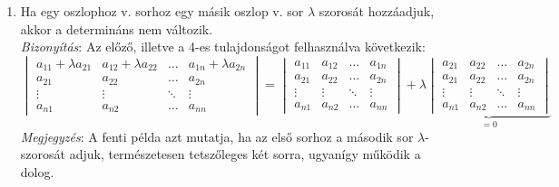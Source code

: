 \documentclass[a4paper,12pt,twoside]{book}
\theoremstyle{break}
\begin{document}
\begin{enumerate}
 \item Ha egy oszlophoz v. sorhoz egy másik oszlop v. sor $\lambda$ szorosát hozzáadjuk, akkor a determináns nem változik.\vspace*{5pt}\\
 \textit{Bizonyítás}: Az előző, illetve a 4-es tulajdonságot felhasználva következik:
\[\begin{vmatrix}
a_{11}+\lambda a_{21} & a_{12}+\lambda a_{22} & \ldots & a_{1n}+\lambda a_{2n}\\
a_{21} & a_{22} & \ldots & a_{2n}\\
\vdots & \vdots & \ddots & \vdots\\
a_{n1} & a_{n2} & \ldots & a_{nn}          
\end{vmatrix} = \begin{vmatrix}
a_{11} & a_{12} & \ldots & a_{1n}\\
a_{21} & a_{22} & \ldots & a_{2n}\\
\vdots & \vdots & \ddots & \vdots\\
a_{n1} & a_{n2} & \ldots & a_{nn}          
\end{vmatrix} + \lambda\underbrace{\begin{vmatrix}
a_{21} & a_{22} & \ldots & a_{2n}\\
a_{21} & a_{22} & \ldots & a_{2n}\\
\vdots & \vdots & \ddots & \vdots\\
a_{n1} & a_{n2} & \ldots & a_{nn}          
\end{vmatrix}}_{= 0}\]
\textit{Megjegyzés}: A fenti példa azt mutatja, ha az első sorhoz a második sor $\lambda$-szorosát adjuk, természetesen tetszőleges két sorra, ugyanígy működik a dolog.


\end{enumerate}
\end{document}
